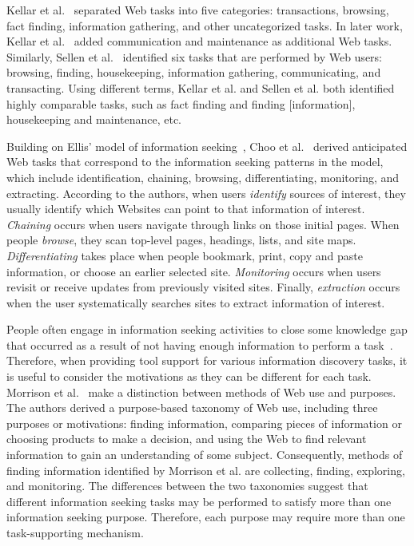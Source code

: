 \documentclass{sigchi}
\begin{document}
Kellar et al.~\cite{kellar2006goal} separated Web tasks into five categories: transactions, browsing, fact finding, information gathering, and other uncategorized tasks. In later work, Kellar et al.~\cite{kellar2007field} added communication and maintenance as additional Web tasks. Similarly, Sellen et al.~\cite{sellen2002knowledge} identified six tasks that are performed by Web users: browsing, finding, housekeeping, information gathering, communicating, and transacting. Using different terms, Kellar et al. and Sellen et al. both identified highly comparable tasks, such as fact finding and finding [information], housekeeping and maintenance, etc. 

Building on Ellis' model of information seeking~\cite{ellis1989behavioural,ellis1993comparison,ellis1997modelling}, Choo et al.~\cite{choo2000information} derived anticipated Web tasks that correspond to the information seeking patterns in the model, which include identification, chaining, browsing, differentiating, monitoring, and extracting.  According to the authors, when users \textit{identify} sources of interest, they usually identify which Websites can point to that information of interest.  \textit{Chaining} occurs when users navigate through links on those initial pages. When people \textit{browse}, they scan top-level pages, headings, lists, and site maps. \textit{Differentiating} takes place when people bookmark, print, copy and paste information, or choose an earlier selected site. \textit{Monitoring} occurs when users revisit or receive updates from previously visited sites. Finally, \textit{extraction} occurs when the user systematically searches sites to extract information of interest.  

People often engage in information seeking activities to close some knowledge gap that occurred as a result of not having enough information to perform a task~\cite{proper1999information}. Therefore, when providing tool support for various information discovery tasks, it is useful to consider the motivations as they can be different for each task. Morrison et al.~\cite{morrison2001taxonomic} make a distinction between methods of Web use and purposes. The authors derived a purpose-based taxonomy of Web use, including three purposes or motivations: finding information, comparing pieces of information or choosing products to make a decision, and using the Web to find relevant information to gain an understanding of some subject. Consequently, methods of finding information identified by Morrison et al. are collecting, finding, exploring, and monitoring. The differences between the two taxonomies suggest that different information seeking tasks may be performed to satisfy more than one information seeking purpose. Therefore, each purpose may require more than one task-supporting mechanism. 
\end{document}
